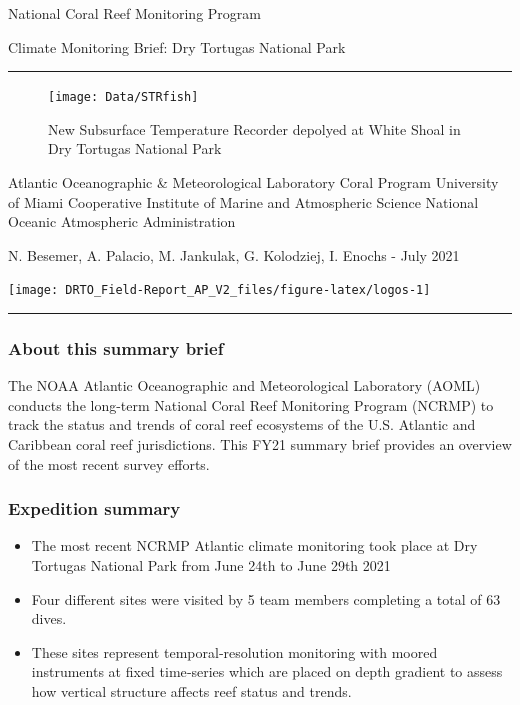 \documentclass[]{article}
\author{}
\date{\vspace{-2.5em}}
\providecommand{\tightlist}{%
  \setlength{\itemsep}{0pt}\setlength{\parskip}{0pt}}
\begin{document}
National Coral Reef Monitoring Program

Climate Monitoring Brief: Dry Tortugas National Park

\begin{center}\rule{0.5\linewidth}{0.5pt}\end{center}

\begin{figure}

{\centering \texttt{[image: Data/STRfish]} 

}

\caption{New Subsurface Temperature Recorder depolyed at White Shoal in Dry Tortugas National Park}\label{fig:front}
\end{figure}

Atlantic Oceanographic \& Meteorological Laboratory Coral Program
University of Miami Cooperative Institute of Marine and Atmospheric
Science National Oceanic Atmospheric Administration

N. Besemer, A. Palacio, M. Jankulak, G. Kolodziej, I. Enochs - July 2021

\begin{flushleft}\texttt{[image: DRTO\_Field-Report\_AP\_V2\_files/figure-latex/logos-1]} \end{flushleft}

\begin{center}\rule{0.5\linewidth}{0.5pt}\end{center}

\hypertarget{about-this-summary-brief}{%
\subsubsection{About this summary
brief}\label{about-this-summary-brief}}

The NOAA Atlantic Oceanographic and Meteorological Laboratory (AOML)
conducts the long-term National Coral Reef Monitoring Program (NCRMP) to
track the status and trends of coral reef ecosystems of the U.S.
Atlantic and Caribbean coral reef jurisdictions. This FY21 summary brief
provides an overview of the most recent survey efforts.

\hypertarget{expedition-summary}{%
\subsubsection{Expedition summary}\label{expedition-summary}}

\begin{itemize}
\tightlist
\item
  The most recent NCRMP Atlantic climate monitoring took place at Dry
  Tortugas National Park from June 24th to June 29th 2021
\item
  Four different sites were visited by 5 team members completing a total
  of 63 dives.
\item
  These sites represent temporal‐resolution monitoring with moored
  instruments at fixed time‐series which are placed on depth gradient to
  assess how vertical structure affects reef status and trends.
\end{itemize}
\end{document}
